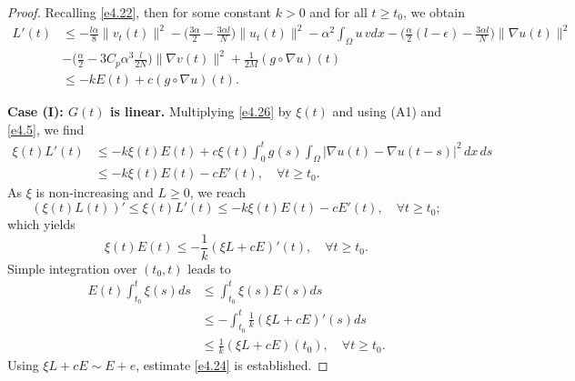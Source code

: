 \documentclass[11pt]{article}
\numberwithin{equation}{section}
\begin{document}
\begin{proof}
Recalling \eqref{e4.22}, then for some constant $k > 0$ and for all $t \geq t_0$,
we obtain
\begin{equation}
\begin{aligned}
L'(t) &\leq - \frac{l\alpha}{8} \| v_t(t) \|^2
 - \Big( \frac{3 \alpha}{2}- \frac{3\alpha l}{N}\Big) \| u_t(t) \|^2
  - \alpha^2 \int_{\Omega} u \, v dx
 - \Big( \frac{\alpha}{2} (l- \epsilon)- \frac{3\alpha l}{N} \Big) \| \nabla u(t) \|^2\\
&- \Big( \frac{\alpha}{2} - 3 C_p \alpha^{3} \frac{l}{2N} \Big)
 \| \nabla v (t)\|^2 +\frac{1}{2M} (g \circ \nabla u)(t)\\
& \leq -k E(t) + c (g \circ \nabla u)(t).
\end{aligned} \label{e4.26}
\end{equation}
\smallskip

\noindent\textbf{Case (I): $G(t)$ is linear.}
Multiplying \eqref{e4.26} by $\xi(t)$ and using (A1) and \eqref{e4.5},
we find
\begin{align*}
\xi(t) L'(t)
&\leq -k \xi(t) E(t) + c \xi(t) \int_0^{t} g(s)
 \int_{\Omega} |\nabla u(t) - \nabla u(t - s)|^2 \, dx \, ds\\
& \leq -k \xi(t) E (t) - c E'(t),\quad \forall t\geq t_0.
\end{align*}
As $\xi$ is non-increasing and $L \geq 0$, we reach
\[
(\xi(t)L(t))'\leq \xi(t)L'(t)\leq - k \xi(t) E(t) - c E'(t),\quad \forall t\geq t_0;
\]
which yields
\[
\xi(t) E(t)\leq -\frac{1}{k}(\xi L+c E)'(t),\quad \forall t\geq t_0.
\]
Simple integration over $(t_0, t)$ leads to
\begin{align*}
E(t) \int_{t_0}^t\xi(s)ds
&\leq \int_{t_0}^t \xi(s) E(s)ds \\
&\leq -\int_{t_0}^t \frac{1}{k}(\xi L+c E)'(s)ds \\
& \leq \frac{1}{k}(\xi L+c E)(t_0),\quad \forall t\geq t_0.
\end{align*}
Using $\xi L+c E \sim E+e$, estimate \eqref{e4.24} is established.
\smallskip


\end{proof}
\end{document}
